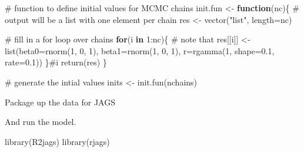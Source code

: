 \documentclass[
  13,
  letterpaper,
]{report}
\newenvironment{Shaded}{\begin{snugshade}}{\end{snugshade}}
\newcommand{\AttributeTok}[1]{\textcolor[rgb]{0.40,0.45,0.13}{#1}}
\newcommand{\CommentTok}[1]{\textcolor[rgb]{0.37,0.37,0.37}{#1}}
\newcommand{\ControlFlowTok}[1]{\textcolor[rgb]{0.00,0.23,0.31}{\textbf{#1}}}
\newcommand{\DecValTok}[1]{\textcolor[rgb]{0.68,0.00,0.00}{#1}}
\newcommand{\FloatTok}[1]{\textcolor[rgb]{0.68,0.00,0.00}{#1}}
\newcommand{\FunctionTok}[1]{\textcolor[rgb]{0.28,0.35,0.67}{#1}}
\newcommand{\NormalTok}[1]{\textcolor[rgb]{0.00,0.23,0.31}{#1}}
\newcommand{\OtherTok}[1]{\textcolor[rgb]{0.00,0.23,0.31}{#1}}
\newcommand{\SpecialCharTok}[1]{\textcolor[rgb]{0.37,0.37,0.37}{#1}}
\newcommand{\StringTok}[1]{\textcolor[rgb]{0.13,0.47,0.30}{#1}}
\begin{document}
\begin{Shaded}
\begin{Highlighting}[]
\CommentTok{\# function to define initial values for MCMC chains}
\NormalTok{init.fun }\OtherTok{\textless{}{-}} \ControlFlowTok{function}\NormalTok{(nc)\{}
  \CommentTok{\# output will be a list with one element per chain}
\NormalTok{  res }\OtherTok{\textless{}{-}} \FunctionTok{vector}\NormalTok{(}\StringTok{"list"}\NormalTok{, }\AttributeTok{length=}\NormalTok{nc)}
  
  \CommentTok{\# fill in a for loop over chains}
  \ControlFlowTok{for}\NormalTok{(i }\ControlFlowTok{in} \DecValTok{1}\SpecialCharTok{:}\NormalTok{nc)\{}
    \CommentTok{\# note that }
\NormalTok{    res[[i]] }\OtherTok{\textless{}{-}} \FunctionTok{list}\NormalTok{(}\AttributeTok{beta0=}\FunctionTok{rnorm}\NormalTok{(}\DecValTok{1}\NormalTok{, }\DecValTok{0}\NormalTok{, }\DecValTok{1}\NormalTok{),}
                     \AttributeTok{beta1=}\FunctionTok{rnorm}\NormalTok{(}\DecValTok{1}\NormalTok{, }\DecValTok{0}\NormalTok{, }\DecValTok{1}\NormalTok{),}
                     \AttributeTok{r=}\FunctionTok{rgamma}\NormalTok{(}\DecValTok{1}\NormalTok{,}
                              \AttributeTok{shape=}\FloatTok{0.1}\NormalTok{,}
                              \AttributeTok{rate=}\FloatTok{0.1}\NormalTok{))}
\NormalTok{  \}}\CommentTok{\#i}
  \FunctionTok{return}\NormalTok{(res)}
\NormalTok{\}}

\CommentTok{\# generate the intial values}
\NormalTok{inits }\OtherTok{\textless{}{-}} \FunctionTok{init.fun}\NormalTok{(nchains)}
\end{Highlighting}
\end{Shaded}

Package up the data for JAGS

\begin{Shaded}
\end{Shaded}

And run the model.

\begin{Shaded}
\begin{Highlighting}[]
\FunctionTok{library}\NormalTok{(R2jags)}
\FunctionTok{library}\NormalTok{(rjags)}
\end{Highlighting}
\end{Shaded}
\end{document}
